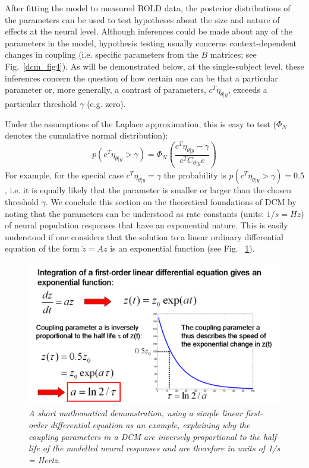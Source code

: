 After fitting the model to measured BOLD data, the posterior distributions of the parameters can be used to test hypotheses about the size and nature of effects at the neural level.  Although inferences could be made about any of the parameters in the model, hypothesis testing usually concerns context-dependent changes in coupling (i.e. specific parameters from the $B$ matrices; see Fig.~\ref{dcm_fig4}).  As will be demonstrated below, at the single-subject level, these inferences concern the question of how certain one can be that a particular parameter or, more generally, a contrast of parameters, $c^T \eta_{\theta | y}$, exceeds a particular threshold  $\gamma$ (e.g. zero).

Under the assumptions of the Laplace approximation, this is easy to test ($\Phi_N$ denotes the cumulative normal distribution):
\begin{equation}
p(c^T \eta_{\theta | y} > \gamma) = \Phi_N \left(\frac{c^T \eta_{\theta | y} - \gamma}{c^T C_{\theta | y} c} \right)
\end{equation}
For example, for the special case $c^T \eta_{\theta | y} = \gamma$ the probability is $p(c^T \eta_{\theta | y} > \gamma)=0.5$, i.e. it is equally likely that the parameter is smaller or larger than the chosen threshold $\gamma$.
We conclude this section on the theoretical foundations of DCM by noting that the parameters can be understood as rate constants (units: $1/s = Hz$) of neural population responses that have an exponential nature.  This is easily understood if one considers that the solution to a linear ordinary differential equation of the form $\dot{z}=Az$ is an exponential function (see Fig. ~\ref{dcm_fig3}).
\begin{figure}[ht]
\begin{center}
\includegraphics[width=120mm]{dcm/Fig3}
\caption{\em A short mathematical demonstration, using a simple linear first-order differential equation as an example, explaining why the coupling parameters in a DCM are inversely proportional to the half-life of the modelled neural responses and are therefore in units of 1/s = Hertz.\label{dcm_fig3}}
\end{center}
\end{figure}

